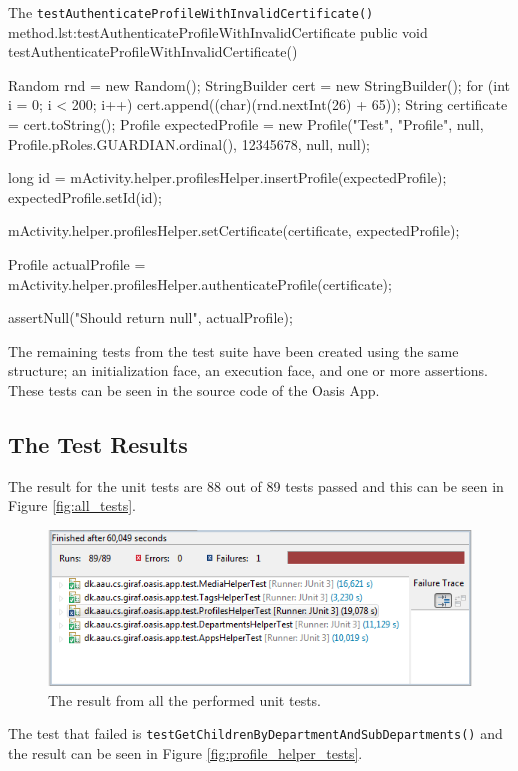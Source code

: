 \begin{Java}{The \texttt{testAuthenticateProfileWithInvalidCertificate()} method.}{lst:testAuthenticateProfileWithInvalidCertificate}
public void testAuthenticateProfileWithInvalidCertificate() {
	Random rnd = new Random();
	StringBuilder cert = new StringBuilder();
	for (int i = 0; i < 200; i++)
	{
		cert.append((char)(rnd.nextInt(26) + 65));
	}
	String certificate = cert.toString();
	Profile expectedProfile = new Profile("Test", "Profile", null, Profile.pRoles.GUARDIAN.ordinal(), 12345678, null, null);

	long id = mActivity.helper.profilesHelper.insertProfile(expectedProfile);
	expectedProfile.setId(id);
	
	mActivity.helper.profilesHelper.setCertificate(certificate, expectedProfile);
			
	Profile actualProfile = mActivity.helper.profilesHelper.authenticateProfile(certificate);

	assertNull("Should return null", actualProfile);
}
\end{Java}

The remaining tests from the test suite have been created using the same structure; an initialization face, an execution face, and one or more assertions.
These tests can be seen in the source code of the Oasis App.

\subsection{The Test Results}
The result for the unit tests are 88 out of 89 tests passed and this can be seen in Figure \vref{fig:all_tests}.

\begin{figure}[htbp]
	\centering
		\includegraphics[width=\textwidth]{Images/unit_testing/all_tests.PNG}
	\caption{The result from all the performed unit tests.}
	\label{fig:all_tests}
\end{figure}

The test that failed is \texttt{testGetChildrenByDepartmentAndSubDepartments()} and the result can be seen in Figure \vref{fig:profile_helper_tests}.

